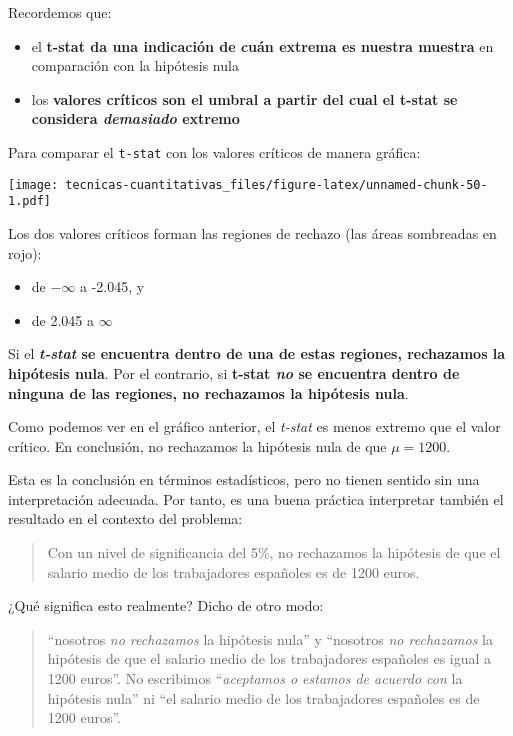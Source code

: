 \documentclass[
]{book}
\providecommand{\tightlist}{%
  \setlength{\itemsep}{0pt}\setlength{\parskip}{0pt}}
\begin{document}
Recordemos que:

\begin{itemize}
\tightlist
\item
  el \textbf{t-stat da una indicación de cuán extrema es nuestra muestra} en comparación con la hipótesis nula
\item
  los \textbf{valores críticos son el umbral a partir del cual el t-stat se considera \emph{demasiado} extremo}
\end{itemize}

Para comparar el \texttt{t-stat} con los valores críticos de manera gráfica:

\texttt{[image: tecnicas-cuantitativas\_files/figure-latex/unnamed-chunk-50-1.pdf]}

Los dos valores críticos forman las regiones de rechazo (las áreas sombreadas en rojo):

\begin{itemize}
\tightlist
\item
  de \(-\infty\) a -2.045, y
\item
  de 2.045 a \(\infty\)
\end{itemize}

Si el \textbf{\emph{t-stat} se encuentra dentro de una de estas regiones, rechazamos la hipótesis nula}. Por el contrario, si \textbf{t-stat \emph{no} se encuentra dentro de ninguna de las regiones, no rechazamos la hipótesis nula}.

Como podemos ver en el gráfico anterior, el \emph{t-stat} es menos extremo que el valor crítico. En conclusión, no rechazamos la hipótesis nula de que \(\mu = 1200\).

Esta es la conclusión en términos estadísticos, pero no tienen sentido sin una interpretación adecuada. Por tanto, es una buena práctica interpretar también el resultado en el contexto del problema:

\begin{quote}
Con un nivel de significancia del 5\%, no rechazamos la hipótesis de que el salario medio de los trabajadores españoles es de 1200 euros.
\end{quote}

¿Qué significa esto realmente? Dicho de otro modo:

\begin{quote}
``nosotros \emph{no rechazamos} la hipótesis nula'' y ``nosotros \emph{no rechazamos} la hipótesis de que el salario medio de los trabajadores españoles es igual a 1200 euros''. No escribimos ``\emph{aceptamos o estamos de acuerdo con} la hipótesis nula'' ni ``el salario medio de los trabajadores españoles es de 1200 euros''.
\end{quote}
\end{document}
